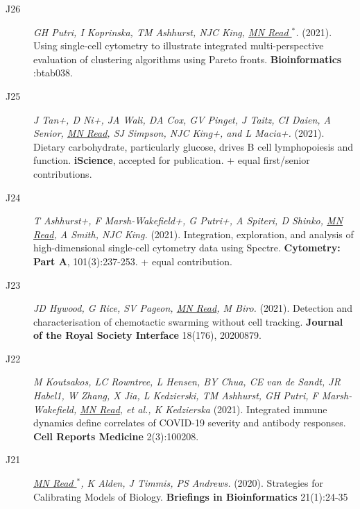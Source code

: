 \documentclass[a4paper]{article}
\begin{document}
\begin{description}

\item[J26]
\textit{GH Putri, I Koprinska, TM Ashhurst, NJC King, \underline{MN Read $^{*}$}.}
(2021).
Using single-cell cytometry to illustrate integrated multi-perspective evaluation of clustering algorithms using Pareto fronts.
\textbf{Bioinformatics} :btab038.

\item[J25]
\textit{J Tan+, D Ni+, JA Wali, DA Cox, GV Pinget, J Taitz, CI Daien, A Senior, \underline{MN Read}, SJ Simpson, NJC King+, and L Macia+.}
(2021).
Dietary carbohydrate, particularly glucose, drives B cell lymphopoiesis and function.
\textbf{iScience}, accepted for publication. + equal first/senior contributions.

\item[J24]
\textit{T Ashhurst+, F Marsh-Wakefield+, G Putri+, A Spiteri, D Shinko, \underline{MN Read}, A Smith, NJC King.}
(2021).
Integration, exploration, and analysis of high-dimensional single-cell cytometry data using Spectre.
\textbf{Cytometry: Part A}, 101(3):237-253. + equal contribution.

\item[J23]
\textit{JD Hywood, G Rice, SV Pageon, \underline{MN Read}, M Biro.}
(2021).
Detection and characterisation of chemotactic swarming without cell tracking.
\textbf{Journal of the Royal Society Interface} 18(176), 20200879.

\item[J22]
\textit{M Koutsakos, LC Rowntree, L Hensen, BY Chua, CE van de Sandt, JR Habel1, W Zhang, X Jia, L Kedzierski, TM Ashhurst, GH Putri, F Marsh-Wakefield, \underline{MN Read}, et al., K Kedzierska}
(2021).
Integrated immune dynamics define correlates of COVID-19 severity and antibody responses.
\textbf{Cell Reports Medicine} 2(3):100208.

\item[J21]
\textit{\underline{MN Read $^{*}$}, K Alden, J Timmis, PS Andrews.}
(2020).
Strategies for Calibrating Models of Biology.
\textbf{Briefings in Bioinformatics} 21(1):24-35


\end{description}
\end{document}
